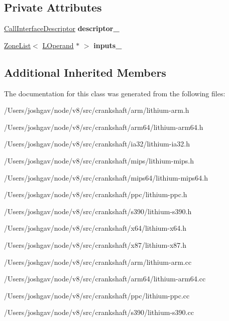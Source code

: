 \subsection*{Private Attributes}
\begin{DoxyCompactItemize}
\item 
\hyperlink{classv8_1_1internal_1_1_call_interface_descriptor}{Call\+Interface\+Descriptor} {\bfseries descriptor\+\_\+}\hypertarget{classv8_1_1internal_1_1_l_call_with_descriptor_aa8ec2ea693e7172e9478670c99f6cf10}{}\label{classv8_1_1internal_1_1_l_call_with_descriptor_aa8ec2ea693e7172e9478670c99f6cf10}

\item 
\hyperlink{classv8_1_1internal_1_1_zone_list}{Zone\+List}$<$ \hyperlink{classv8_1_1internal_1_1_l_operand}{L\+Operand} $\ast$ $>$ {\bfseries inputs\+\_\+}\hypertarget{classv8_1_1internal_1_1_l_call_with_descriptor_ab76982ad53633a4064ebb6ff28c6dd20}{}\label{classv8_1_1internal_1_1_l_call_with_descriptor_ab76982ad53633a4064ebb6ff28c6dd20}

\end{DoxyCompactItemize}
\subsection*{Additional Inherited Members}


The documentation for this class was generated from the following files\+:\begin{DoxyCompactItemize}
\item 
/\+Users/joshgav/node/v8/src/crankshaft/arm/lithium-\/arm.\+h\item 
/\+Users/joshgav/node/v8/src/crankshaft/arm64/lithium-\/arm64.\+h\item 
/\+Users/joshgav/node/v8/src/crankshaft/ia32/lithium-\/ia32.\+h\item 
/\+Users/joshgav/node/v8/src/crankshaft/mips/lithium-\/mips.\+h\item 
/\+Users/joshgav/node/v8/src/crankshaft/mips64/lithium-\/mips64.\+h\item 
/\+Users/joshgav/node/v8/src/crankshaft/ppc/lithium-\/ppc.\+h\item 
/\+Users/joshgav/node/v8/src/crankshaft/s390/lithium-\/s390.\+h\item 
/\+Users/joshgav/node/v8/src/crankshaft/x64/lithium-\/x64.\+h\item 
/\+Users/joshgav/node/v8/src/crankshaft/x87/lithium-\/x87.\+h\item 
/\+Users/joshgav/node/v8/src/crankshaft/arm/lithium-\/arm.\+cc\item 
/\+Users/joshgav/node/v8/src/crankshaft/arm64/lithium-\/arm64.\+cc\item 
/\+Users/joshgav/node/v8/src/crankshaft/ppc/lithium-\/ppc.\+cc\item 
/\+Users/joshgav/node/v8/src/crankshaft/s390/lithium-\/s390.\+cc\end{DoxyCompactItemize}
